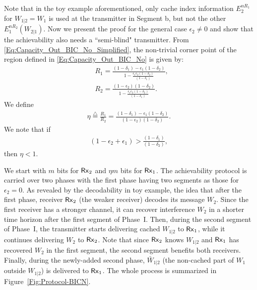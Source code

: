 \documentclass[journal,12pt,draftcls,onecolumn]{IEEEtran}
\begin{document}
Note that in the toy example aforementioned, only cache index information $E^{nR_1}_2$ for $W_{1|2}=W_1$ is used at the transmitter in Segment b, but not the other $E^{nR_2}_1 (W_{2|1})$.  Now we present the proof for the general case $\epsilon_2 \neq 0$ and show that the achievability also needs a ``semi-blind" transmitter. From \eqref{Eq:Capacity_Out_BIC_No_Simplified}, the non-trivial corner point of the region defined in \eqref{Eq:Capacity_Out_BIC_No} is given by:
\begin{align}
\label{Eq:GeneralRates}
&R_1 = \frac{(1-\delta_1)- \epsilon_1(1-\delta_2)}{1-\frac{\epsilon_1 \epsilon_2 (1-\delta_2)}{(1-\delta_1)}}, \nonumber \\
&R_2 = \frac{(1-\epsilon_2)(1-\delta_2)}{1-\frac{\epsilon_1 \epsilon_2 (1-\delta_2)}{(1-\delta_1)}}.
\end{align}
We define
\begin{align}
\eta \overset{\triangle}= \frac{R_1}{R_2} = \frac{(1-\delta_1)-\epsilon_1(1-\delta_2)}{(1-\epsilon_2)(1-\delta_2)}.
\end{align}
We note that if
\begin{align}
(1-\epsilon_2+\epsilon_1) >  \frac{(1-\delta_1)}{(1-\delta_2)},
\end{align}
then $\eta < 1$.

 We start with $m$ bits for ${\sf Rx}_2$ and $\eta m$ bits for ${\sf Rx}_1$. The achievability protocol is carried over two phases with the first phase having two segments as those for $\epsilon_2=0$. As revealed by the decodability in toy example, the idea that after the first phase, receiver ${\sf Rx}_2$ (the weaker receiver) decodes its message $W_2$. Since the first receiver has a stronger channel, it can recover interference $W_2$ in a shorter time horizon after the first segment of Phase~I. Then, during the second segment of Phase~I, the transmitter starts delivering cached $W_{1|2}$ to ${\sf Rx}_1$, while it continues delivering $W_2$ to ${\sf Rx}_2$. Note that since ${\sf Rx}_2$ knows $W_{1|2}$ and ${\sf Rx}_1$ has recovered $W_2$ in the first segment, the second segment benefits both receivers. Finally, during the newly-added second phase, $\bar{W}_{1|2}$ (the non-cached part of $W_1$ outside $W_{1|2}$) is delivered to ${\sf Rx}_1$. The whole process is summarized in Figure~\ref{Fig:Protocol-BICN}.\
\end{document}

